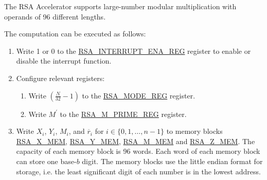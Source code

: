 \documentclass[main\_\_EN.tex]{subfiles}
\begin{document}
The RSA Accelerator supports large-number modular multiplication with operands of 96 different lengths.

The computation can be executed as follows:

\begin{enumerate}

    \item Write 1 or 0 to the \hyperref[regdesc:RSAINTERRUPTENAREG]{RSA\_INTERRUPT\_ENA\_REG} register to enable or disable the interrupt function.
    
    \item Configure relevant registers:
    
    \begin{enumerate}
        \item Write \begin{math}( \frac{N}{32} - 1 )\end{math} to the \hyperref[regdesc:RSAMODEXPMODEREG]{RSA\_MODE\_REG} register.
        
        \item Write \begin{math}M^{\prime}\end{math} to the \hyperref[regdesc:RSAMPRIMEREG]{RSA\_M\_PRIME\_REG} register.
        
    \end{enumerate}

    \item Write
        \begin{math}X_{i}\end{math}, 
        \begin{math}Y_{i}\end{math}, 
        \begin{math}M_{i}\end{math}, and
        \begin{math}\overline{r}_{i}\end{math} for \begin{math}i \in \{ 0, 1, \dots, n-1 \} \end{math} to memory blocks \hyperref[regdesc:RSAmemory]{RSA\_X\_MEM}, \hyperref[regdesc:RSAmemory]{RSA\_Y\_MEM}, \hyperref[regdesc:RSAmemory]{RSA\_M\_MEM} and \hyperref[regdesc:RSAmemory]{RSA\_Z\_MEM}. The capacity of each memory block is 96 words. Each word of each memory block can store one base-\begin{math}b\end{math} digit. The memory blocks use the little endian format for storage, i.e. the least significant digit of each number is in the lowest address.


\end{enumerate}
\end{document}
